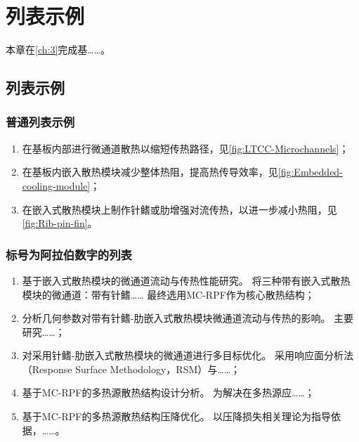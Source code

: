 
\chapter{列表示例}\label{ch:4}

本章在\cref{ch:3}完成基……。

\section{列表示例}\label{sec:1}

\subsection{普通列表示例}
\begin{enumerate}
    \item 在基板内部进行微通道散热以缩短传热路径，见\cref{fig:LTCC-Microchannels}；
    \item 在基板内嵌入散热模块减少整体热阻，提高热传导效率，见\cref{fig:Embedded-cooling-module}；
    \item 在嵌入式散热模块上制作针鳍或肋增强对流传热，以进一步减小热阻，见\cref{fig:Rib-pin-fin}。
\end{enumerate}

\subsection{标号为阿拉伯数字的列表}

\begin{enumerate}[label =(\arabic*)]

    \item 基于嵌入式散热模块的微通道流动与传热性能研究。
          将三种带有嵌入式散热模块的微通道：带有针鳍……
          最终选用MC-RPF作为核心散热结构；
    \item 分析几何参数对带有针鳍-肋嵌入式散热模块微通道流动与传热的影响。
          主要研究……；
    \item 对采用针鳍-肋嵌入式散热模块的微通道进行多目标优化。
          采用响应面分析法（Response Surface Methodology，RSM）与……；
    \item 基于MC-RPF的多热源散热结构设计分析。
          为解决在多热源应……；
    \item 基于MC-RPF的多热源散热结构压降优化。
          以压降损失相关理论为指导依据，……。

\end{enumerate}

